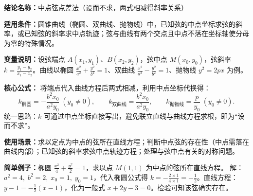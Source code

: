\textbf{结论名称：}中点弦点差法（设而不求，两式相减得斜率关系）

\textbf{适用条件：}圆锥曲线（椭圆、双曲线、抛物线）中，已知弦的中点坐标求弦的斜率，或已知弦的斜率求中点轨迹；弦与曲线有两个交点且中点不落在坐标轴使分母为零的特殊情况。

\textbf{变量说明：}设弦端点 \(A(x_1,y_1)\)、\(B(x_2,y_2)\)，弦中点 \(M(x_0,y_0)\)，弦斜率 \(k=\frac{y_1-y_2}{x_1-x_2}\)。曲线以椭圆 \(\frac{x^2}{a^2}+\frac{y^2}{b^2}=1\)、双曲线 \(\frac{x^2}{a^2}-\frac{y^2}{b^2}=1\)、抛物线 \(y^2=2px\) 为例。

\textbf{核心公式：}
将端点代入曲线方程后两式相减，利用中点坐标代换得：
\[
\boxed{k_{\text{椭圆}} = -\frac{b^2x_0}{a^2y_0}\;(y_0\neq 0)},\qquad
\boxed{k_{\text{双曲线}} = \frac{b^2x_0}{a^2y_0}},\qquad
\boxed{k_{\text{抛物线}} = \frac{p}{y_0}\;(y_0\neq 0)}.
\]
统一思路：\(k\) 可通过中点坐标直接写出，避免联立直线与曲线方程求根，即为“设而不求”。

\textbf{使用场景：}求以定点为中点的弦所在直线方程；判断中点弦的存在性（中点需落在曲线内部）；已知弦的斜率求弦中点轨迹方程；处理与弦中点有关的对称问题。

\textbf{简单例子：}椭圆 \(\frac{x^2}{4}+\frac{y^2}{2}=1\)，求以点 \(M(1,1)\) 为中点的弦所在直线方程。
解：\(a^2=4,\;b^2=2,\;x_0=1,\;y_0=1\)，代入椭圆公式得 \(k=-\frac{2\times1}{4\times1}=-\frac12\)。直线方程：\(y-1=-\frac12(x-1)\)，化为一般式 \(x+2y-3=0\)。检验可知该弦确实存在。